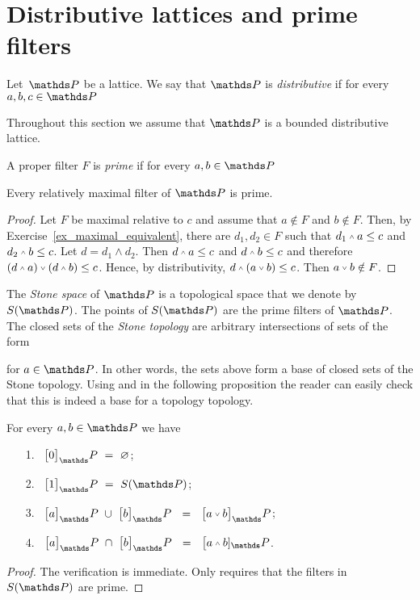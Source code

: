 \documentclass[creche.tex]{subfiles}
\begin{document}
\section{Distributive lattices and prime filters}\label{prime_filters}

Let\ $\PP$ be a lattice. We say that $\PP$ is \emph{distributive\/} if for every $a,b,c\in\PP$



Throughout this section we assume that $\PP$ is a bounded distributive lattice.

A proper filter $F$ is \emph{prime\/} if for every $a,b\in\PP$


\begin{proposition}\label{prop_massimalisonoprimi}
Every relatively maximal filter of\/ $\PP$ is prime.
\end{proposition}

\begin{proof}
Let $F$ be maximal relative to $c$ and assume that $a\notin F$ and $b\notin F$. Then, by Exercise~\ref{ex_maximal_equivalent}, there are $d_1, d_2\in F$ such that $d_1\swedge a\le c$ and $d_2\swedge b\le c$. Let $d=d_1\wedge d_2$. Then  $d\swedge a\le c$ and $d\swedge b\le c$ and therefore $(d\swedge a)\svee(d\swedge b)\le c$. Hence, by distributivity, $d\swedge (a\svee b)\le c$. Then $a\svee b\notin F$.
\end{proof}

The \emph{Stone space\/} of $\PP$ is a topological space that we denote by \emph{$S(\PP)$}. The points of \emph{$S(\PP)$} are the prime filters of $\PP$. The closed sets of the \emph{Stone topology} are arbitrary intersections of sets of the form


for $a\in\PP$. In other words, the sets above form a base of closed sets of the Stone topology. Using  and  in the following proposition the reader can easily check that this is indeed a base for a topology topology.

\begin{proposition}\label{prop_brouwerstopology}
For every $a,b\in\PP$ we have
\begin{itemize}
\item[1.]\ $\big[0\big]_\PP\ =\ \0$;
\item[2.]\ $\big[1\big]_\PP\ =\ S(\PP)$;
\item[3.]\ $\big[a\big]_\PP\ \cup\ \big[b\big]_\PP\ \ =\ \ \big[a\svee b\big]_\PP$;
\item[4.]\ $\big[a\big]_\PP\ \cap\ \big[b\big]_\PP\ \ =\ \ \big[a\swedge b]_\PP$.
\end{itemize}
\end{proposition}
\begin{proof}
The verification is immediate. Only  requires that the filters in $S(\PP)$ are prime.
\end{proof}
\end{document}
